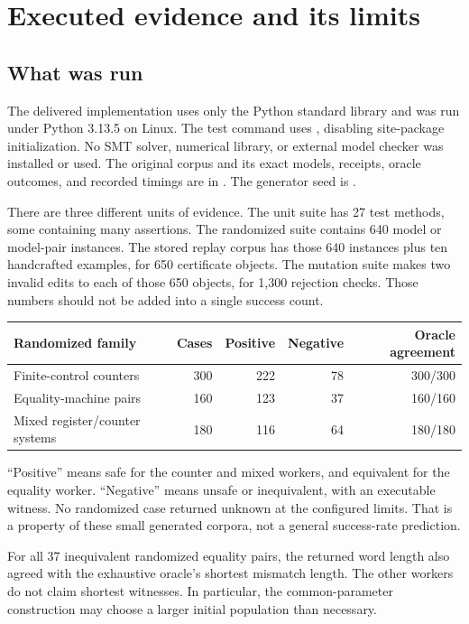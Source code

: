 \section{Executed evidence and its limits}
\label{sec:evidence}

\subsection{What was run}
The delivered implementation uses only the Python standard library and was run
under Python 3.13.5 on Linux. The test command uses , disabling
site-package initialization. No SMT solver, numerical library, or external
model checker was installed or used. The original corpus and its exact models,
receipts, oracle outcomes, and recorded timings are in .
The generator seed is .

There are three different units of evidence. The unit suite has 27 test methods,
some containing many assertions. The randomized suite contains 640 model or
model-pair instances. The stored replay corpus has those 640 instances plus ten
handcrafted examples, for 650 certificate objects. The mutation suite makes two
invalid edits to each of those 650 objects, for 1,300 rejection checks. Those
numbers should not be added into a single success count.

\begin{center}
\begin{tabular}{@{}lrrrr@{}}
\toprule
Randomized family & Cases & Positive & Negative & Oracle agreement \\
\midrule
Finite-control counters & 300 & 222 & 78 & 300/300 \\
Equality-machine pairs & 160 & 123 & 37 & 160/160 \\
Mixed register/counter systems & 180 & 116 & 64 & 180/180 \\
\bottomrule
\end{tabular}
\end{center}

``Positive'' means safe for the counter and mixed workers, and equivalent for
the equality worker. ``Negative'' means unsafe or inequivalent, with an
executable witness. No randomized case returned unknown at the configured
limits. That is a property of these small generated corpora, not a general
success-rate prediction.

For all 37 inequivalent randomized equality pairs, the returned word length
also agreed with the exhaustive oracle's shortest mismatch length. The other
workers do not claim shortest witnesses. In particular, the common-parameter
construction may choose a larger initial population than necessary.

